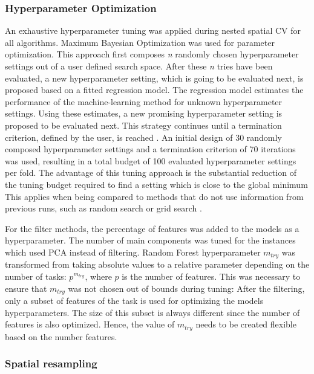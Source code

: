 \documentclass[letterpaper, journal]{IEEEtran}
\begin{document}
\subsubsection{Hyperparameter Optimization}

\noindent An exhaustive hyperparameter tuning was applied during nested spatial \ac{CV} for all algorithms.
Maximum Bayesian Optimization \cite{mlrmbo} was used for parameter optimization.
This approach first composes \textit{n} randomly chosen hyperparameter settings out of a user defined search space.
After these \textit{n} tries have been evaluated, a new hyperparameter setting, which is going to be evaluated next, is proposed based on a fitted regression model.
The regression model estimates the performance of the machine-learning method for unknown hyperparameter settings.
Using these estimates, a new promising hyperparameter setting is proposed to be evaluated next.
This strategy continues until a termination criterion, defined by the user, is reached \cite{hutter2011, jones1998}.
An initial design of 30 randomly composed hyperparameter settings and a termination criterion of 70 iterations was used, resulting in a total budget of 100 evaluated hyperparameter settings per fold.
The advantage of this tuning approach is the substantial reduction of the tuning budget required to find a setting which is close to the global minimum
This applies when being compared to methods that do not use information from previous runs, such as random search or grid search \cite{bergstra2012}.

For the filter methods, the percentage of features was added to the models as a hyperparameter.
The number of main components was tuned for the instances which used \ac{PCA} instead of filtering.
Random Forest hyperparameter \texttt{$m_{try}$} was transformed from taking absolute values to a relative parameter depending on the number of tasks: $p^{m_{try}}$, where $p$ is the number of features.
This was necessary to ensure that \texttt{$m_{try}$} was not chosen out of bounds during tuning:
After the filtering, only a subset of features of the task is used for optimizing the models hyperparameters.
The size of this subset is always different since the number of features is also optimized.
Hence, the value of  \texttt{$m_{try}$} needs to be created flexible based on the number features.

\subsubsection{Spatial resampling}
\end{document}
